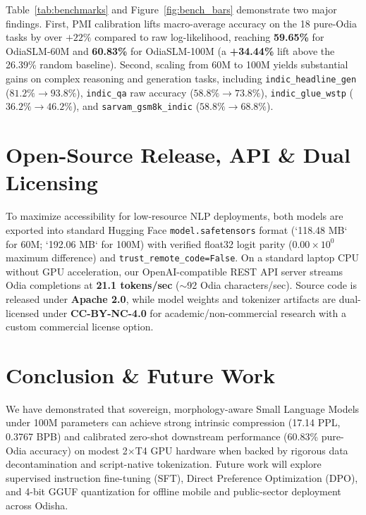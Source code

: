 \documentclass[10pt,twocolumn,letterpaper]{article}
\begin{document}
Table~\ref{tab:benchmarks} and Figure~\ref{fig:bench_bars} demonstrate two major findings. First, PMI calibration lifts macro-average accuracy on the 18 pure-Odia tasks by over $+22\%$ compared to raw log-likelihood, reaching \textbf{59.65\%} for OdiaSLM-60M and \textbf{60.83\%} for OdiaSLM-100M (a \textbf{+34.44\%} lift above the 26.39\% random baseline). Second, scaling from 60M to 100M yields substantial gains on complex reasoning and generation tasks, including \texttt{indic\_headline\_gen} ($81.2\% \rightarrow \mathbf{93.8\%}$), \texttt{indic\_qa} raw accuracy ($58.8\% \rightarrow \mathbf{73.8\%}$), \texttt{indic\_glue\_wstp} ($36.2\% \rightarrow \mathbf{46.2\%}$), and \texttt{sarvam\_gsm8k\_indic} ($58.8\% \rightarrow \mathbf{68.8\%}$).

\section{Open-Source Release, API \& Dual Licensing}
To maximize accessibility for low-resource NLP deployments, both models are exported into standard Hugging Face \texttt{model.safetensors} format (`118.48 MB` for 60M; `192.06 MB` for 100M) with verified float32 logit parity ($0.00\times 10^0$ maximum difference) and \texttt{trust\_remote\_code=False}. On a standard laptop CPU without GPU acceleration, our OpenAI-compatible REST API server streams Odia completions at \textbf{21.1 tokens/sec} ($\sim$92 Odia characters/sec). Source code is released under \textbf{Apache 2.0}, while model weights and tokenizer artifacts are dual-licensed under \textbf{CC-BY-NC-4.0} for academic/non-commercial research with a custom commercial license option.

\section{Conclusion \& Future Work}
We have demonstrated that sovereign, morphology-aware Small Language Models under 100M parameters can achieve strong intrinsic compression (17.14 PPL, 0.3767 BPB) and calibrated zero-shot downstream performance (60.83\% pure-Odia accuracy) on modest 2$\times$T4 GPU hardware when backed by rigorous data decontamination and script-native tokenization. Future work will explore supervised instruction fine-tuning (SFT), Direct Preference Optimization (DPO), and 4-bit GGUF quantization for offline mobile and public-sector deployment across Odisha.



\end{document}
